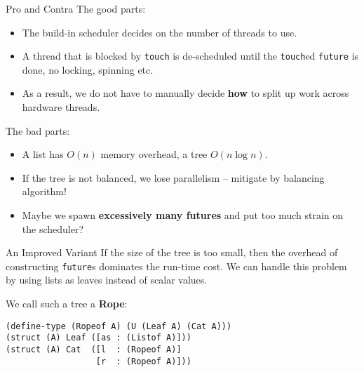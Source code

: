 \documentclass{beamer}
\begin{document}
\begin{frame}{Pro and Contra}
  The good parts:

  \begin{itemize}
  \item The build-in scheduler decides on the number of threads to use.
  \item A thread that is blocked by \lstinline{touch} is de-scheduled until the \lstinline{touch}ed \lstinline{future} is done, no locking, spinning etc.
  \item As a result, we do not have to manually decide \textbf{how} to split up work across hardware threads.
  \end{itemize}

  \pause{}

  The bad parts:
  \begin{itemize}
  \item A list has $O(n)$ memory overhead, a tree $O(n \log n)$.
  \item If the tree is not balanced, we lose parallelism -- mitigate by balancing algorithm!
  \item Maybe we spawn \textbf{excessively many futures} and put too much strain on the scheduler?
  \end{itemize}
\end{frame}

\begin{frame}[fragile]{An Improved Variant}
If the size of the tree is too small, then the overhead of constructing \lstinline{future}s dominates the run-time cost. We can handle this problem by using lists as leaves instead of scalar values.

\vspace{0.5cm}

We call such a tree a \textbf{Rope}:

\begin{lstlisting}
(define-type (Ropeof A) (U (Leaf A) (Cat A)))
(struct (A) Leaf ([as : (Listof A)]))
(struct (A) Cat  ([l  : (Ropeof A)]
                  [r  : (Ropeof A)]))
\end{lstlisting}
\end{frame}
\end{document}
